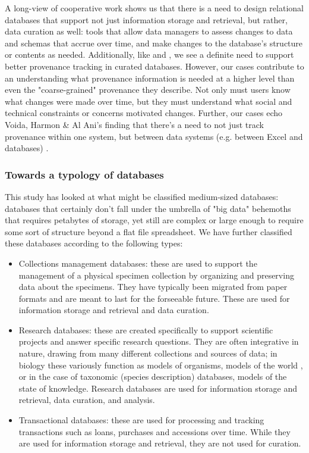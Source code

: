 A long-view of cooperative work shows us that there is a need to design relational databases that support not just information storage and retrieval, but rather, data curation as well: tools that allow data managers to assess changes to data and schemas that accrue over time, and make changes to the database's structure or contents as needed. Additionally, like \cite{Buneman_2006} and \cite{jagadish2007making}, we see a definite need to support better provenance tracking in curated databases. However, our cases contribute to an understanding what provenance information is needed at a higher level than even the "coarse-grained" provenance they describe. Not only must users know what changes were made over time, but they must understand what social and technical constraints or concerns motivated changes. Further, our cases echo Voida, Harmon & Al Ani's finding that there's a need to not just track provenance within one system, but between data systems (e.g. between Excel and databases) \cite{voida2011homebrew}.

\subsubsection{Towards a typology of databases}

This study has looked at what might be classified medium-sized databases: databases that certainly don't fall under the umbrella of "big data" behemoths that requires petabytes of storage, yet still are complex or large enough to require some sort of structure beyond a flat file spreadsheet. We have further classified these databases according to the following types:

\begin{itemize}
\item Collections management databases: these are used to support the management of a physical specimen collection by organizing and preserving data about the specimens. They have typically been migrated from paper formats and are meant to last for the forseeable future. These are used for information storage and retrieval and data curation.
\item Research databases: these are created specifically to support scientific projects and answer specific research questions. They are often integrative in nature, drawing from many different collections and sources of data; in biology these variously function as models of organisms\cite{Hine_2006}, models of the world \cite{Bowker_2000}, or in the case of taxonomic (species description) databases, models of the state of knowledge. Research databases are used for information storage and retrieval, data curation, and analysis.
\item Transactional databases: these are used for processing and tracking transactions such as loans, purchases and accessions over time. While they are used for information storage and retrieval, they are not used for curation.
\end{itemize}

